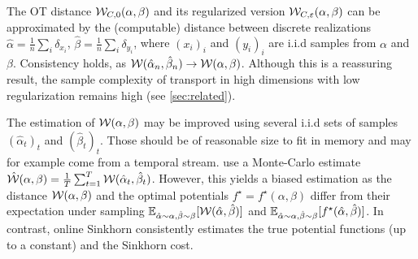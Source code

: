 The OT distance $\mathcal{W}_{C,0}(\alpha,\beta)$ and its regularized version
$\mathcal{W}_{C,\varepsilon}(\alpha,\beta)$ can be approximated by the (computable)
distance between discrete realizations $\hat \alpha = \frac{1}{n} \sum_i
\delta_{x_i}$, $\hat \beta = \frac{1}{n} \sum_i \delta_{y_i}$, where ${(x_i)}_i$
and ${(y_i)}_i$ are i.i.d samples from $\alpha$ and $\beta$.  Consistency holds,
as $\mathcal{W}(\hat \alpha_n, \hat \beta_n) \to \mathcal{W}(\alpha,
\beta)$. Although this is a reassuring result, the sample complexity of
transport in high dimensions with low regularization remains high (see
\autoref{sec:related}).


The estimation of $\mathcal{W}(\alpha,\beta)$ may be improved using several i.i.d sets
of samples $(\hat \alpha_t)_t$ and ${(\hat \beta_t)}_t$. Those should be of
reasonable size to fit in memory and may for example come from a temporal
stream. \cite{2018-Genevay-aistats} use a Monte-Carlo estimate $\hat {\mathcal{W}}(\alpha,
\beta) = \frac{1}{T} \sum_{t=1}^T \mathcal{W}(\hat \alpha_t, \hat \beta_t)$. However,
this yields a biased estimation as the distance $\mathcal{W}(\alpha, \beta)$ and the
optimal potentials $f^\star=f^\star(\alpha, \beta)$ differ from their
expectation under sampling $\mathbb{E}_{\hat \alpha \sim \alpha, \hat \beta \sim \beta}
[\mathcal{W}(\hat \alpha, \hat \beta)]$ and $\mathbb{E}_{\hat \alpha \sim \alpha, \hat \beta
\sim \beta}[f^\star(\hat \alpha, \hat \beta)]$. In contrast, online Sinkhorn
consistently estimates the true potential functions (up to a constant) and the
Sinkhorn cost.